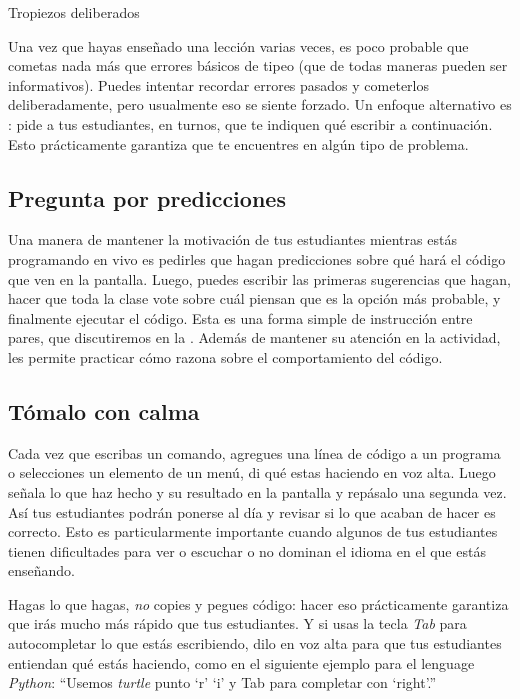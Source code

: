 \begin{aside}{Tropiezos deliberados}
  
  Una vez que hayas enseñado una lección varias veces,
  es poco probable que cometas nada más que errores básicos de tipeo
  (que de todas maneras pueden ser informativos).
  Puedes intentar recordar errores pasados y cometerlos deliberadamente,
  pero usualmente eso se siente forzado.
  Un enfoque alternativo es :
  pide a tus estudiantes, en turnos, que te indiquen qué escribir a continuación.
  Esto prácticamente garantiza que te encuentres en algún tipo de problema.
\end{aside}

\subsection*{Pregunta por predicciones}

Una manera de mantener la motivación de tus estudiantes mientras estás programando en vivo
es pedirles que hagan predicciones sobre qué hará el código que ven en la pantalla.
Luego, puedes escribir las primeras sugerencias que hagan,
hacer que toda la clase vote sobre cuál piensan que es la opción más probable,
y finalmente ejecutar el código.
Esta es una forma simple de instrucción entre pares,
que discutiremos en la .
Además de mantener su atención en la actividad,
les permite practicar cómo razona sobre el comportamiento del código.

\subsection*{Tómalo con calma}

Cada vez que escribas un comando,
agregues una línea de código a un programa
o selecciones un elemento de un menú,
di qué estas haciendo en voz alta.
Luego señala lo que haz hecho y su resultado en la pantalla
y repásalo una segunda vez.
Así tus estudiantes podrán ponerse al día
y revisar si lo que acaban de hacer es correcto.
Esto es particularmente importante cuando algunos de tus estudiantes tienen 
dificultades para ver o escuchar o no dominan el idioma en el que estás enseñando.

Hagas lo que hagas,
\emph{no} copies y pegues código:
hacer eso prácticamente garantiza que irás mucho más rápido que tus estudiantes.
Y si usas la tecla \emph{Tab} para autocompletar lo que estás escribiendo,
dilo en voz alta para que tus estudiantes entiendan qué estás haciendo, 
como en el siguiente ejemplo para el lenguage \emph{Python}:
``Usemos \emph{turtle} punto `r' `i' y Tab para completar con `right'.''

